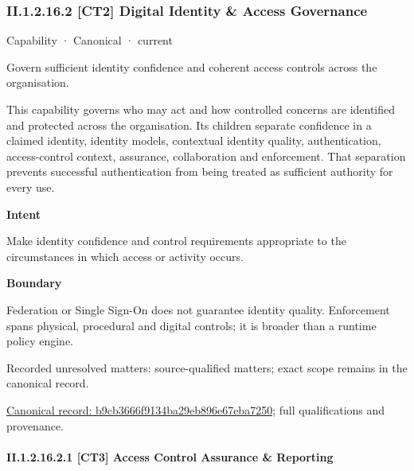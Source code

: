 \subsubsection*{II.1.2.16.2 [CT2] Digital Identity \& Access Governance}
\label{navigation:II.1.2.16.2}

\label{element:b9cb3666f9134ba29eb896e67eba7250}
{\small Capability · Canonical · current}\par

Govern sufficient identity confidence and coherent access controls across the organisation.



This capability governs who may act and how controlled concerns are identified and protected across the organisation. Its children separate confidence in a claimed identity, identity models, contextual identity quality, authentication, access-control context, assurance, collaboration and enforcement. That separation prevents successful authentication from being treated as sufficient authority for every use.



\textbf{Intent}



Make identity confidence and control requirements appropriate to the circumstances in which access or activity occurs.



\textbf{Boundary}



Federation or Single Sign-On does not guarantee identity quality. Enforcement spans physical, procedural and digital controls; it is broader than a runtime policy engine.


{\small Recorded unresolved matters: source-qualified matters; exact scope remains in the canonical record.}\par
{\footnotesize \href{../../../../../../../continuum/strategy/capability/b9cb3666f9134ba29eb896e67eba7250.md}{Canonical record: b9cb3666f9134ba29eb896e67eba7250}; full qualifications and provenance.}\par
\paragraph*{II.1.2.16.2.1 [CT3] Access Control Assurance \& Reporting}
\label{navigation:II.1.2.16.2.1}


